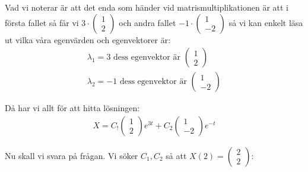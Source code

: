 \par\bigskip
\noindent Vad vi noterar är att det enda som händer vid matrismultiplikationen är att i första fallet så får vi $3\cdot\begin{pmatrix}1\\2\end{pmatrix}$ och andra fallet $-1\cdot\begin{pmatrix}1\\-2\end{pmatrix}$ så vi kan enkelt läsa ut vilka våra egenvärden och egenvektorer är:
\begin{equation*}
  \begin{gathered}
    \lambda_1 = 3\text{ dess egenvektor är } \begin{pmatrix}1\\2\end{pmatrix}\\
    \lambda_2 = -1\text{ dess egenvektor är } \begin{pmatrix}1\\-2\end{pmatrix}
  \end{gathered}
\end{equation*}
\par\bigskip
\noindent Då har vi allt för att hitta lösningen:
\begin{equation*}
  \begin{gathered}
    X = C_!\begin{pmatrix}1\\2\end{pmatrix}e^{3t}+C_2\begin{pmatrix}1\\-2\end{pmatrix}e^{-t}
  \end{gathered}
\end{equation*}
\par\bigskip
\noindent Nu skall vi svara på frågan. Vi söker $C_1, C_2$ så att $X(2)=\begin{pmatrix}2\\2\end{pmatrix}$:
